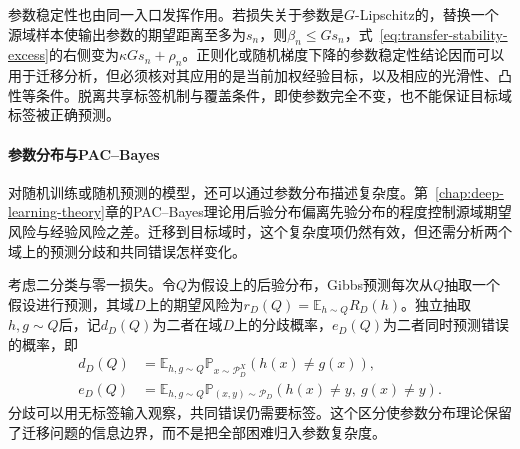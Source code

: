 参数稳定性也由同一入口发挥作用。若损失关于参数是$G$-Lipschitz的，替换一个源域样本使输出参数的期望距离至多为$s_n$，则$\beta_n\leq Gs_n$，式~\eqref{eq:transfer-stability-excess}的右侧变为$\kappa Gs_n+\rho_n$。正则化或随机梯度下降的参数稳定性结论因而可以用于迁移分析，但必须核对其应用的是当前加权经验目标，以及相应的光滑性、凸性等条件。脱离共享标签机制与覆盖条件，即使参数完全不变，也不能保证目标域标签被正确预测。

\paragraph{参数分布与PAC--Bayes}
\label{sec:transfer-pac-bayes}

对随机训练或随机预测的模型，还可以通过参数分布描述复杂度。第~\ref{chap:deep-learning-theory}章的PAC--Bayes理论用后验分布偏离先验分布的程度控制源域期望风险与经验风险之差。迁移到目标域时，这个复杂度项仍然有效，但还需分析两个域上的预测分歧和共同错误怎样变化。

考虑二分类与零一损失。令$Q$为假设上的后验分布，Gibbs预测每次从$Q$抽取一个假设进行预测，其域$D$上的期望风险为$r_D(Q)=\mathbb E_{h\sim Q}R_D(h)$。独立抽取$h,g\sim Q$后，记$d_D(Q)$为二者在域$D$上的分歧概率，$e_D(Q)$为二者同时预测错误的概率，即
\begin{align*}
 d_D(Q)&=\mathbb E_{h,g\sim Q}\mathbb P_{x\sim\mathcal P_D^X}(h(x)\neq g(x)),\\
 e_D(Q)&=\mathbb E_{h,g\sim Q}\mathbb P_{(x,y)\sim\mathcal P_D}
                       (h(x)\neq y,\ g(x)\neq y).
\end{align*}
分歧可以用无标签输入观察，共同错误仍需要标签。这个区分使参数分布理论保留了迁移问题的信息边界，而不是把全部困难归入参数复杂度。

